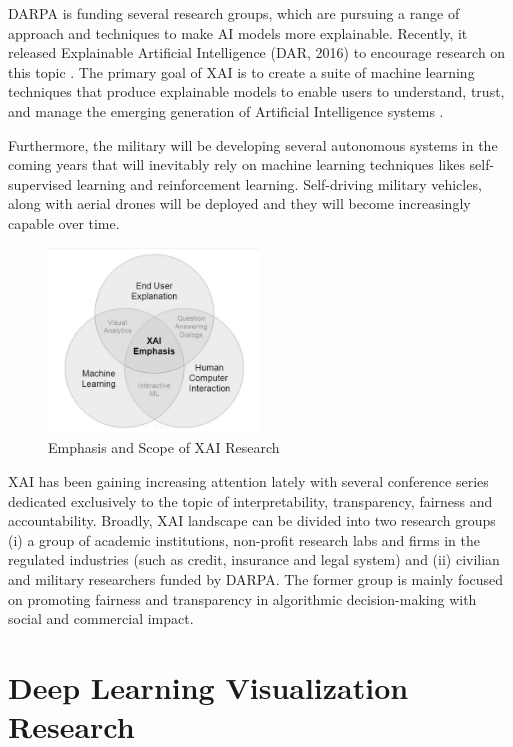 DARPA is funding several research groups, which are pursuing a range of approach and techniques to make AI models more explainable. Recently, it released Explainable Artificial Intelligence (DAR, 2016) to encourage research on this topic \cite{Gunning}. The primary goal of XAI is to create a suite of machine learning techniques that produce explainable models to enable users to understand, trust, and manage the emerging generation of Artificial Intelligence systems \cite{Gunning2}.

Furthermore, the military will be developing several autonomous systems in the coming years that will inevitably rely  on machine learning techniques likes self-supervised learning and reinforcement learning. Self-driving military vehicles, along with aerial drones will be deployed and they will become increasingly capable over time.

\begin{figure}[htbp]
\centering
\includegraphics[width=0.5\textwidth]{images/XAI-research-1-crop.png}
\caption{Emphasis and Scope of XAI Research \protect\footnotemark}
\label{fig:xai-1}
\end{figure}

XAI has been gaining increasing attention lately with several conference series dedicated exclusively to the topic of interpretability, transparency, fairness and accountability. Broadly, XAI landscape can be divided into two research groups (i) a group of academic institutions, non-profit research labs and firms in the regulated industries (such as credit, insurance and legal system) and (ii) civilian and military researchers funded by DARPA. The former group is mainly focused on promoting fairness and transparency in algorithmic decision-making with social and commercial impact.

\section{Deep Learning Visualization Research}

